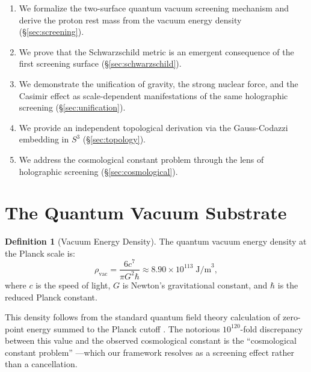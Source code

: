 \documentclass[12pt, a4paper]{article}
\theoremstyle{plain}
\theoremstyle{definition}
\newtheorem{definition}[theorem]{Definition}
\begin{document}
\begin{enumerate}
  \item We formalize the two-surface quantum vacuum screening mechanism and
    derive the proton rest mass from the vacuum energy density
    (\S\ref{sec:screening}).
  \item We prove that the Schwarzschild metric is an emergent consequence
    of the first screening surface (\S\ref{sec:schwarzschild}).
  \item We demonstrate the unification of gravity, the strong nuclear force,
    and the Casimir effect as scale-dependent manifestations of the same
    holographic screening (\S\ref{sec:unification}).
  \item We provide an independent topological derivation via the Gauss-Codazzi
    embedding in $S^3$ (\S\ref{sec:topology}).
  \item We address the cosmological constant problem through the lens of
    holographic screening (\S\ref{sec:cosmological}).
\end{enumerate}

\section{The Quantum Vacuum Substrate}\label{sec:vacuum}

\begin{definition}[Vacuum Energy Density]\label{def:rho_vac}
  The quantum vacuum energy density at the Planck scale is:
  \begin{equation}\label{eq:rho_vac}
    \rho_{\text{vac}} = \frac{6c^7}{\pi G^2 \hbar}
    \approx 8.90 \times 10^{113} \; \text{J/m}^3,
  \end{equation}
  where $c$ is the speed of light, $G$ is Newton's gravitational constant,
  and $\hbar$ is the reduced Planck constant.
\end{definition}

This density follows from the standard quantum field theory calculation of
zero-point energy summed to the Planck cutoff \citep{Weinberg1989}. The
notorious $10^{120}$-fold discrepancy between this value and the observed
cosmological constant is the ``cosmological constant problem''
\citep{Weinberg1989}---which our framework resolves as a screening effect
rather than a cancellation.
\end{document}

